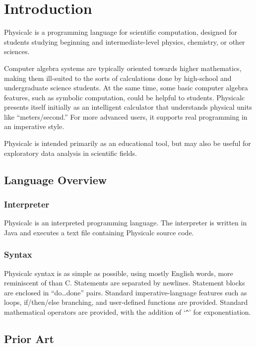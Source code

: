 \chapter{Introduction}

Physicalc is a programming language for scientific computation,
designed for students studying beginning and intermediate-level
physics, chemistry, or other sciences.  

Computer algebra systems are typically oriented towards higher
mathematics, making them ill-suited to the sorts of calculations done
by high-school and undergraduate science students.  At the same time,
some basic computer algebra features, such as symbolic computation,
could be helpful to students.  Physicalc presents itself initially as
an intelligent calculator that understands physical units like
``meters/second.''  For more advanced users, it supports real
programming in an imperative style.

Physicalc is intended primarily as an educational tool, but may also
be useful for exploratory data analysis in scientific fields.

\section{Language Overview}

\subsection{Interpreter}

Physicalc is an interpreted programming language. The interpreter is
written in Java and executes a text file containing Physicalc source
code.

\subsection{Syntax}

Physicalc syntax is as simple as possible, using mostly English words,
more reminiscent of  than C\@.  Statements are separated by
newlines.  Statement blocks are enclosed in ``do\dots done'' pairs.
Standard imperative-language features such as loops, if/then/else
branching, and user-defined functions are provided. Standard
mathematical operators are provided, with the addition of `\verb+^+'
for exponentiation.

\section{Prior Art}

